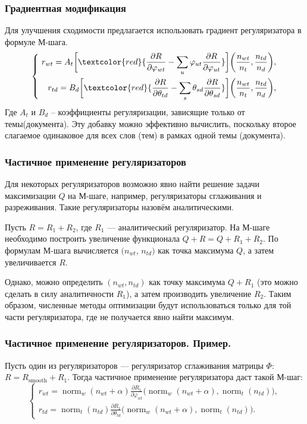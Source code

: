 \documentclass[utf8]{beamer}
\DeclareMathOperator{\norm}{norm}
\renewcommand{\phi}{\varphi}
\begin{document}
	
\begin{frame}
\frametitle{Градиентная модификация}
Для улучшения сходимости предлагается использовать градиент регуляризатора в формуле М-шага.
\[
\left\{\
	\begin{aligned}
		r_{wt} =  A_t \bigg[\textcolor{red} {\frac{\partial{R}}{\partial{\phi_{wt}}} - \sum\limits_u \phi_{ut} \frac{\partial{R}}{\partial{\phi_{ut}}} }\bigg] \bigg(\frac{n_{wt}}{n_t}, \frac{n_{td}}{n_d}\bigg),\\
		r_{td} =  B_d \bigg[ \textcolor{red} {\frac{\partial{R}}{\partial{\theta_{td}}} - \sum\limits_s \theta_{sd} \frac{\partial{R}}{\partial{\theta_{sd}}} }\bigg] \bigg(\frac{n_{wt}}{n_t}, \frac{n_{td}}{n_d}\bigg),
	\end{aligned}
\right.
\]
Где $A_t$ и $B_d$ -- коэффициенты регуляризации, зависящие только от темы(документа). Эту добавку можно эффективно вычислить, поскольку второе слагаемое одинаковое для всех слов (тем) в рамках одной темы (документа).
\end{frame}


\begin{frame}
\frametitle{Частичное применение регуляризаторов}
Для некоторых регуляризаторов возможно явно найти решение  задачи  максимизации  $Q$ на М-шаге, например, регуляризаторы сглаживания и разреживания. Такие регуляризаторы назовём аналитическими.
\medskip

Пусть $R = R_1 + R_2$, где $R_1$ --- аналитический регуляризатор. На М-шаге необходимо построить увеличение функционала $Q + R = Q + R_1 + R_2$. По формулам М-шага вычисляется $(n_{wt}$, $n_{td})$ как точка максимума $Q$, а затем увеличивается $R$.  
\medskip

Однако, можно определить $(n_{wt},n_{td})$ как точку максимума $Q + R_1 $ (это можно сделать в силу аналитичности $R_1$), а затем производить увеличение $R_2$. Таким образом,  численные методы оптимизации будут использоваться только для той части регуляризатора, где не получается явно найти максимум.
\end{frame}

\begin{frame}
\frametitle{Частичное применение регуляризаторов. Пример.}
Пусть один из регуляризаторов --- регуляризатор сглаживания матрицы $\Phi$: $R = R_{\text{smooth}} + R_1$. Тогда частичное применение регуляризатора даст такой М-шаг:
\[
\left\{
	\begin{aligned}
		r_{wt} = \norm_w(n_{wt} + \alpha) \frac{\partial{R_1}}{\partial{\phi_{wt}}} \bigg( \norm_w(n_{wt} + \alpha),\norm_t(n_{td})\bigg),\\
		r_{td} = \norm_t(n_{td}) \frac{\partial{R_1}}{\partial{\theta_{td}}} \bigg(\norm_w(n_{wt} + \alpha), \norm_t(n_{td})\bigg).
	\end{aligned}
\right.
\]
\end{frame}
\end{document}
